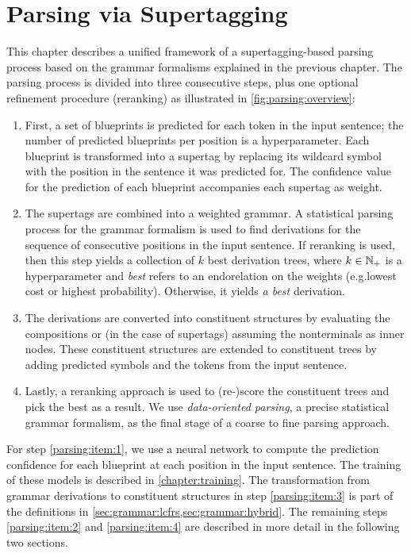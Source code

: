 \documentclass[../document.tex]{subfiles}
\begin{document}
    \chapter{Parsing via Supertagging}
    This chapter describes a unified framework of a supertagging-based parsing process based on the grammar formalisms explained in the previous chapter.
    The parsing process is divided into three consecutive steps, plus one optional refinement procedure (reranking) as illustrated in \cref{fig:parsing:overview}:
    \begin{enumerate}
        \item\label{parsing:item:1}
            First, a set of blueprints is predicted for each token in the input sentence; the number of predicted blueprints per position is a hyperparameter.
            Each blueprint is transformed into a supertag by replacing its wildcard symbol with the position in the sentence it was predicted for.
            The confidence value for the prediction of each blueprint accompanies each supertag as weight.
        \item\label{parsing:item:2}
            The supertags are combined into a weighted grammar.
            A statistical parsing process for the grammar formalism is used to find derivations for the sequence of consecutive positions in the input sentence.
            If reranking is used, then this step yields a collection of \(k\) best derivation trees, where \(k \in \mathbb{N}_+\) is a hyperparameter and \emph{best} refers to an endorelation on the weights (e.g.\@ lowest cost or highest probability).
            Otherwise, it yields \emph{a best} derivation.
        \item\label{parsing:item:3}
            The derivations are converted into constituent structures by evaluating the  compositions or (in the case of  supertags) assuming the nonterminals as inner nodes.
            These constituent structures are extended to constituent trees by adding predicted  symbols and the tokens from the input sentence.
        \item\label{parsing:item:4}
            Lastly, a reranking approach is used to (re-)score the constituent trees and pick the best as a result.
            We use \emph{data-oriented parsing}, a precise statistical grammar formalism, as the final stage of a coarse to fine parsing approach. \citep{CraSchBod16}
    \end{enumerate}
    For step \ref{parsing:item:1}, we use a neural network to compute the prediction confidence for each blueprint at each position in the input sentence.
    The training of these models is described in \cref{chapter:training}.
    The transformation from grammar derivations to constituent structures in step \ref{parsing:item:3} is part of the definitions in \cref{sec:grammar:lcfrs,sec:grammar:hybrid}.
    The remaining steps \ref{parsing:item:2} and \ref{parsing:item:4} are described in more detail in the following two sections.
\end{document}
